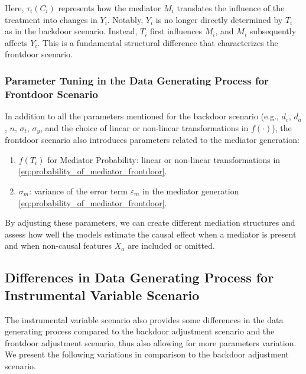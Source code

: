 \documentclass{article}
\numberwithin{equation}{section}
\begin{document}
Here, $\tau_i(C_i)$ represents how the mediator $M_i$ translates the influence of the treatment into changes in $Y_i$. Notably, $Y_i$ is no longer directly determined by $T_i$ as in the backdoor scenario. Instead, $T_i$ first influences $M_i$, and $M_i$ subsequently affects $Y_i$. This is a fundamental structural difference that characterizes the frontdoor scenario.

\subsubsection{Parameter Tuning in the Data Generating Process for Frontdoor Scenario}
\label{subsubsec:parameter_tuning_in_the_data_generating_process_frontdoor}

In addition to all the parameters mentioned for the backdoor scenario (e.g., $d_c$, $d_a$, $n$, $\sigma_t$, $\sigma_y$, and the choice of linear or non-linear transformations in $f(\cdot)$), the frontdoor scenario also introduces parameters related to the mediator generation:

\begin{enumerate}[label=\roman*.]
    \item $f(T_i)$ for Mediator Probability: linear or non-linear transformations in \eqref{eq:probability_of_mediator_frontdoor}.
    \item $\sigma_m$: variance of the error term $\varepsilon_m$ in the mediator generation \eqref{eq:probability_of_mediator_frontdoor}.
\end{enumerate}

By adjusting these parameters, we can create different mediation structures and assess how well the models estimate the causal effect when a mediator is present and when non-causal features $X_a$ are included or omitted.

\subsection{Differences in Data Generating Process for Instrumental Variable Scenario}
\label{subsec:differences_in_data_generating_process_for_instrumental_variable_scenario}

The instrumental variable scenario also provides some differences in the data generating process compared to the backdoor adjustment scenario and the frontdoor adjustment scenario, thus also allowing for more parameters variation. We present the following variations in comparison to the backdoor adjustment scenario.
\end{document}
